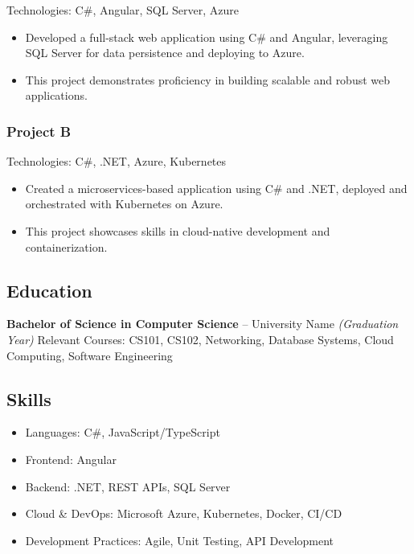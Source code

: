 \documentclass[
]{article}
\providecommand{\tightlist}{%
  \setlength{\itemsep}{0pt}\setlength{\parskip}{0pt}}
\begin{document}
Technologies: C\#, Angular, SQL Server, Azure

\begin{itemize}
\tightlist
\item
  Developed a full-stack web application using C\# and Angular,
  leveraging SQL Server for data persistence and deploying to Azure.
\item
  This project demonstrates proficiency in building scalable and robust
  web applications.
\end{itemize}

\subsubsection{\texorpdfstring{\textbf{Project
B}}{Project B}}\label{project-b}

Technologies: C\#, .NET, Azure, Kubernetes

\begin{itemize}
\tightlist
\item
  Created a microservices-based application using C\# and .NET, deployed
  and orchestrated with Kubernetes on Azure.
\item
  This project showcases skills in cloud-native development and
  containerization.
\end{itemize}

\subsection{\texorpdfstring{\textbf{Education}}{Education}}\label{education}

\textbf{Bachelor of Science in Computer Science} -- University Name
\emph{(Graduation Year)} Relevant Courses: CS101, CS102, Networking,
Database Systems, Cloud Computing, Software Engineering

\subsection{\texorpdfstring{\textbf{Skills}}{Skills}}\label{skills}

\begin{itemize}
\tightlist
\item
  Languages: C\#, JavaScript/TypeScript
\item
  Frontend: Angular
\item
  Backend: .NET, REST APIs, SQL Server
\item
  Cloud \& DevOps: Microsoft Azure, Kubernetes, Docker, CI/CD
\item
  Development Practices: Agile, Unit Testing, API Development
\end{itemize}
\end{document}
